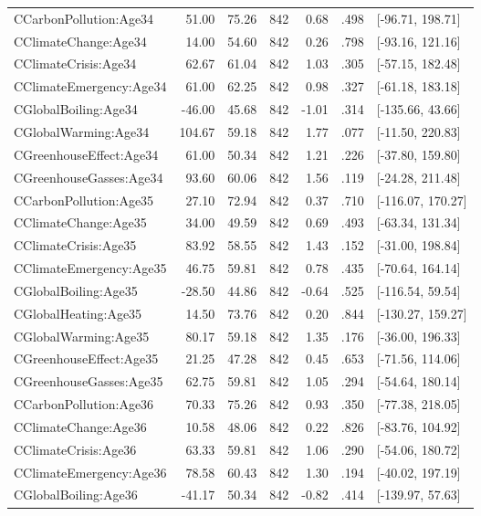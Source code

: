\begin{table}[ht]
\begin{tabular}{lrrrrrl}
  CCarbonPollution:Age34 & 51.00 & 75.26 & 842 & 0.68 & .498 & [-96.71, 198.71] \\ 
  CClimateChange:Age34 & 14.00 & 54.60 & 842 & 0.26 & .798 & [-93.16, 121.16] \\ 
  CClimateCrisis:Age34 & 62.67 & 61.04 & 842 & 1.03 & .305 & [-57.15, 182.48] \\ 
  CClimateEmergency:Age34 & 61.00 & 62.25 & 842 & 0.98 & .327 & [-61.18, 183.18] \\ 
  CGlobalBoiling:Age34 & -46.00 & 45.68 & 842 & -1.01 & .314 & [-135.66, 43.66] \\ 
  CGlobalWarming:Age34 & 104.67 & 59.18 & 842 & 1.77 & .077 & [-11.50, 220.83] \\ 
  CGreenhouseEffect:Age34 & 61.00 & 50.34 & 842 & 1.21 & .226 & [-37.80, 159.80] \\ 
  CGreenhouseGasses:Age34 & 93.60 & 60.06 & 842 & 1.56 & .119 & [-24.28, 211.48] \\ 
  CCarbonPollution:Age35 & 27.10 & 72.94 & 842 & 0.37 & .710 & [-116.07, 170.27] \\ 
  CClimateChange:Age35 & 34.00 & 49.59 & 842 & 0.69 & .493 & [-63.34, 131.34] \\ 
  CClimateCrisis:Age35 & 83.92 & 58.55 & 842 & 1.43 & .152 & [-31.00, 198.84] \\ 
  CClimateEmergency:Age35 & 46.75 & 59.81 & 842 & 0.78 & .435 & [-70.64, 164.14] \\ 
  CGlobalBoiling:Age35 & -28.50 & 44.86 & 842 & -0.64 & .525 & [-116.54, 59.54] \\ 
  CGlobalHeating:Age35 & 14.50 & 73.76 & 842 & 0.20 & .844 & [-130.27, 159.27] \\ 
  CGlobalWarming:Age35 & 80.17 & 59.18 & 842 & 1.35 & .176 & [-36.00, 196.33] \\ 
  CGreenhouseEffect:Age35 & 21.25 & 47.28 & 842 & 0.45 & .653 & [-71.56, 114.06] \\ 
  CGreenhouseGasses:Age35 & 62.75 & 59.81 & 842 & 1.05 & .294 & [-54.64, 180.14] \\ 
  CCarbonPollution:Age36 & 70.33 & 75.26 & 842 & 0.93 & .350 & [-77.38, 218.05] \\ 
  CClimateChange:Age36 & 10.58 & 48.06 & 842 & 0.22 & .826 & [-83.76, 104.92] \\ 
  CClimateCrisis:Age36 & 63.33 & 59.81 & 842 & 1.06 & .290 & [-54.06, 180.72] \\ 
  CClimateEmergency:Age36 & 78.58 & 60.43 & 842 & 1.30 & .194 & [-40.02, 197.19] \\ 
  CGlobalBoiling:Age36 & -41.17 & 50.34 & 842 & -0.82 & .414 & [-139.97, 57.63] \\ 

\end{tabular}
\end{table}
